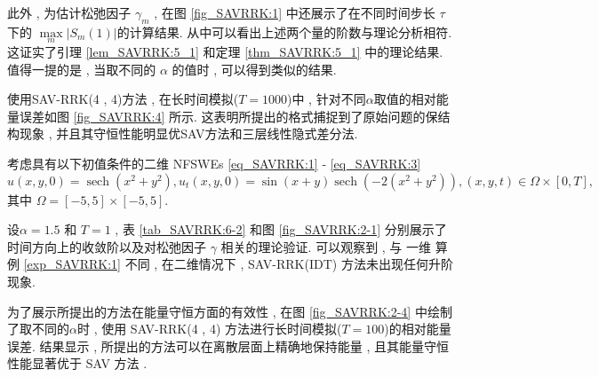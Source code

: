		此外 , 为估计松弛因子 $\gamma_m$ , 在图 \ref{fig_SAVRRK:1} 中还展示了在不同时间步长 $\tau$下的 $\max\limits _m\left|S_m(1)\right|$的计算结果.
从中可以看出上述两个量的阶数与理论分析相符.这证实了引理 \ref{lem_SAVRRK:5_1} 和定理 \ref{thm_SAVRRK:5_1} 中的理论结果.
值得一提的是 , 当取不同的 $\alpha$ 的值时 , 可以得到类似的结果.%

		使用SAV-RRK(4 , 4)方法 , 在长时间模拟($T=1000$)中 , 针对不同$\alpha$取值的相对能量误差如图 \ref{fig_SAVRRK:4} 所示.
		这表明所提出的格式捕捉到了原始问题的保结构现象 , 并且其守恒性能明显优SAV方法\cite{chengConvergenceEnergyconservingScheme2022}和三层线性隐式差分法\cite{wangConservativeLinearizedDifference2015}.
		
	\begin{example}\label{exp_SAVRRK:2}
		考虑具有以下初值条件的二维 NFSWEs \eqref{eq_SAVRRK:1} - \eqref{eq_SAVRRK:3}
		\begin{equation*}
		u(x , y , 0)=\operatorname{sech}\left(x^2+y^2\right) , u_t(x , y , 0)=\sin (x+y) \operatorname{sech}\left(-2\left(x^2+y^2\right)\right) , (x , y , t) \in \Omega \times[0 , T] , 
		\end{equation*}
		其中 $\Omega=[-5 , 5] \times[-5 , 5]$.
		\end{example}
			
		设$\alpha=1.5$ 和 $T=1$ , 表 \ref{tab_SAVRRK:6-2} 和图 \ref{fig_SAVRRK:2-1} 分别展示了时间方向上的收敛阶以及对松弛因子 $\gamma$ 相关的理论验证.
		可以观察到 , 与 一维 算例 \ref{exp_SAVRRK:1} 不同 , 在二维情况下 , SAV-RRK(IDT) 方法未出现任何升阶现象.

		为了展示所提出的方法在能量守恒方面的有效性 , 在图 \ref{fig_SAVRRK:2-4} 中绘制了取不同的$\alpha$时 , 使用 SAV-RRK(4 , 4) 方法进行长时间模拟($T=100$)的相对能量误差.
结果显示 , 所提出的方法可以在离散层面上精确地保持能量 , 且其能量守恒性能显著优于 SAV 方法 \cite{chengConvergenceEnergyconservingScheme2022}.

